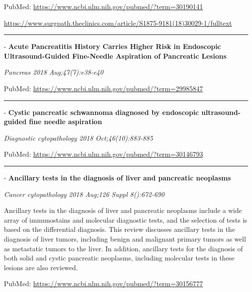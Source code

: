 \documentclass[]{article}
\begin{document}
PubMed: \url{https://www.ncbi.nlm.nih.gov/pubmed/?term=30190141}

{}

{}

\url{https://www.surgpath.theclinics.com/article/S1875-9181(18)30029-1/fulltext}

\begin{center}\rule{0.5\linewidth}{\linethickness}\end{center}

 - \textbf{Acute Pancreatitis History Carries Higher Risk in Endoscopic
Ultrasound-Guided Fine-Needle Aspiration of Pancreatic Lesions}

\emph{Pancreas 2018 Aug;47(7):e38-e40}

PubMed: \url{https://www.ncbi.nlm.nih.gov/pubmed/?term=29985847}

{}

{}

\begin{center}\rule{0.5\linewidth}{\linethickness}\end{center}

 - \textbf{Cystic pancreatic schwannoma diagnosed by endoscopic
ultrasound-guided fine needle aspiration}

\emph{Diagnostic cytopathology 2018 Oct;46(10):883-885}

PubMed: \url{https://www.ncbi.nlm.nih.gov/pubmed/?term=30146793}

{}

{}

\begin{center}\rule{0.5\linewidth}{\linethickness}\end{center}

 - \textbf{Ancillary tests in the diagnosis of liver and pancreatic
neoplasms}

\emph{Cancer cytopathology 2018 Aug;126 Suppl 8():672-690}

Ancillary tests in the diagnosis of liver and pancreatic neoplasms
include a wide array of immunostains and molecular diagnostic tests, and
the selection of tests is based on the differential diagnosis. This
review discusses ancillary tests in the diagnosis of liver tumors,
including benign and malignant primary tumors as well as metastatic
tumors to the liver. In addition, ancillary tests for the diagnosis of
both solid and cystic pancreatic neoplasms, including molecular tests in
these lesions are also reviewed.

PubMed: \url{https://www.ncbi.nlm.nih.gov/pubmed/?term=30156777}
\end{document}
